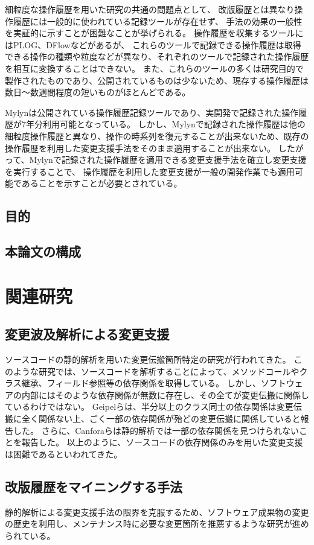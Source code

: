 \documentclass[a4paper]{jsbook}
\begin{document}
細粒度な操作履歴を用いた研究の共通の問題点として、
改版履歴とは異なり操作履歴には一般的に使われている記録ツールが存在せず、
手法の効果の一般性を実証的に示すことが困難なことが挙げられる。
操作履歴を収集するツールにはPLOG\cite{plog}、{\sc DFlow}\cite{minelli:2014}などがあるが、
これらのツールで記録できる操作履歴は取得できる操作の種類や粒度などが異なり、それぞれのツールで記録された操作履歴を相互に変換することはできない。
また、これらのツールの多くは研究目的で製作されたものであり、公開されているものは少ないため、現存する操作履歴は数日〜数週間程度の短いものがほとんどである。

Mylyn\cite{Kersten:2005}は公開されている操作履歴記録ツールであり、実開発で記録された操作履歴が7年分利用可能となっている。
しかし、Mylynで記録された操作履歴は他の細粒度操作履歴と異なり、操作の時系列を復元することが出来ないため、既存の操作履歴を利用した変更支援手法をそのまま適用することが出来ない。
したがって、Mylynで記録された操作履歴を適用できる変更支援手法を確立し変更支援を実行することで、
操作履歴を利用した変更支援が一般の開発作業でも適用可能であることを示すことが必要とされている。
\section{目的}
\section{本論文の構成}
\chapter{関連研究}
\section{変更波及解析による変更支援}
ソースコードの静的解析を用いた変更伝搬箇所特定の研究が行われてきた\cite{792645}。
このような研究では、ソースコードを解析することによって、メソッドコールやクラス継承、フィールド参照等の依存関係を取得している。
しかし、ソフトウェアの内部にはそのような依存関係が無数に存在し、その全てが変更伝搬に関係しているわけではない。
Geipelら\cite{Geipel:2009}は、半分以上のクラス同士の依存関係は変更伝搬に全く関係ない上、ごく一部の依存関係が殆どの変更伝搬に関係していると報告した。
さらに、Canforaら\cite{5609732}は静的解析では一部の依存関係を見つけられないことを報告した。
以上のように、ソースコードの依存関係のみを用いた変更支援は困難であるといわれてきた。

\section{改版履歴をマイニングする手法}
静的解析による変更支援手法の限界を克服するため、ソフトウェア成果物の変更の歴史を利用し、メンテナンス時に必要な変更箇所を推薦するような研究が進められている。
\end{document}
